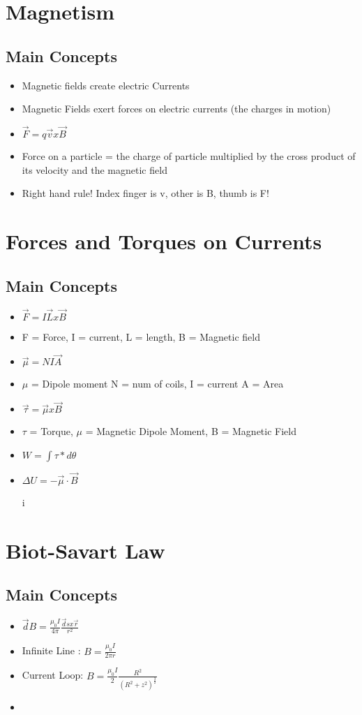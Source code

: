 \documentclass{article}
\begin{document}
\section{Magnetism}
\subsection{Main Concepts}
\begin{itemize}
	\item Magnetic fields create electric Currents
	\item Magnetic Fields exert forces on electric currents (the charges in motion)
	\item $\vec F = q \vec v x \vec B$
	\item Force on a particle  = the charge of particle multiplied by the cross product of its velocity and the magnetic field
	\item Right hand rule! Index finger is v, other is B, thumb is F!
\end{itemize}

\section{Forces and Torques on Currents}
\subsection{Main Concepts}
\begin{itemize}
	\item $\vec F = I \vec L x \vec B$
	\item F = Force, I = current, L = length, B = Magnetic field
	\item $\vec \mu = NI \vec A$
	\item $\mu$ = Dipole moment N = num of coils, I = current A = Area 
	\item $\vec\tau = \vec\mu x \vec B $
	\item $\tau$ = Torque, $\mu$ = Magnetic Dipole Moment, B = Magnetic Field
	\item $W = \int\tau  * d\theta$
	\item $\Delta U = -\vec\mu\cdot\vec B$

	i 
\end{itemize}
\section{Biot-Savart Law}
\subsection{Main Concepts}
\begin{itemize}
	\item $\vec dB = \frac{\mu_0 I}{4 \pi} \frac{\vec ds x \vec r}{r^2}$
	\item \vec Infinite Line : $B= \frac{\mu_0 I}{2 \pi r}$
	\item Current Loop: $ B = \frac{\mu_0 I }{2} \frac{R^2}{(R^2 + z^2)^\frac{3}{2}}$
	\item 
\end{itemize}
\end{document}
